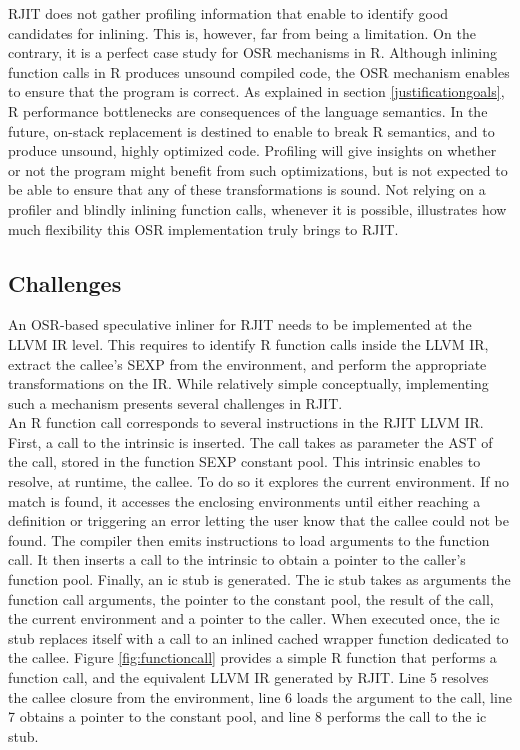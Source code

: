 RJIT does not gather profiling information that enable to identify good candidates for inlining.
This is, however, far from being a limitation.
On the contrary, it is a perfect case study for OSR mechanisms in R.
Although inlining function calls in R produces unsound compiled code, the OSR mechanism enables to ensure that the program is correct.
As explained in section \ref{justificationgoals}, R performance bottlenecks are consequences of the language semantics.
In the future, on-stack replacement is destined to enable to break R semantics, and to produce unsound, highly optimized code.
Profiling will give insights on whether or not the program might benefit from such optimizations, but is not expected to be able to ensure that any of these transformations is sound.
Not relying on a profiler and blindly inlining function calls, whenever it is possible, illustrates how much flexibility this OSR implementation truly brings to RJIT.\\ 

\subsection{Challenges}
An OSR-based speculative inliner for RJIT needs to be implemented at the LLVM IR level.
This requires to identify R function calls inside the LLVM IR, extract the callee's SEXP from the environment, and perform the appropriate transformations on the IR.
While relatively simple conceptually, implementing such a mechanism presents several challenges in RJIT.\\

An R function call corresponds to several instructions in the RJIT LLVM IR.
First, a call to the  intrinsic is inserted.
The call takes as parameter the AST of the call, stored in the function SEXP constant pool.
This intrinsic enables to resolve, at runtime, the callee. 
To do so it explores the current environment.
If no match is found, it accesses the enclosing environments until either reaching a definition or triggering an error letting the user know that the callee could not be found.
The compiler then emits instructions to load arguments to the function call.
It then inserts a call to the  intrinsic to obtain a pointer to the caller's function pool.
Finally, an ic stub is generated. 
The ic stub takes as arguments the function call arguments, the pointer to the constant pool, the result of the  call, the current environment and a pointer to the caller.
When executed once, the ic stub replaces itself with a call to an inlined cached wrapper function dedicated to the callee.
Figure \ref{fig:functioncall} provides a simple R function that performs a function call, and the equivalent LLVM IR generated by RJIT.
Line 5 resolves the callee closure from the environment, line 6 loads the argument to the call, line 7 obtains a pointer to the constant pool, and line 8 performs the call to the ic stub.\\

